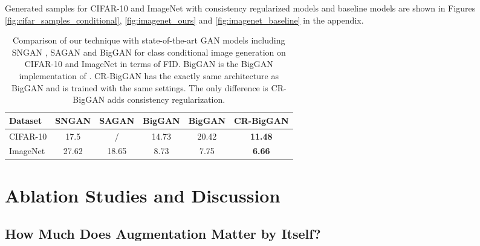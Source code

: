 \documentclass{article} \usepackage{iclr2020_conference,times}
\begin{document}
Generated samples for CIFAR-10 and ImageNet with consistency regularized models and baseline models are shown in Figures \ref{fig:cifar_samples_conditional}, \ref{fig:imagenet_ours} and \ref{fig:imagenet_baseline} in the appendix.

\begin{table*}[hbt]
\begin{center}
\begin{tabular}{l|ccccc}
\hline
Dataset  & SNGAN &SAGAN  & BigGAN  & BigGAN & CR-BigGAN \\
\hline
CIFAR-10 & 17.5  & /&  14.73  &20.42 & \textbf{11.48} \\
ImageNet & 27.62 & 18.65 &  8.73    & 7.75 & \textbf{6.66} \\ 

\hline
\hline
\end{tabular}
\end{center}
\vspace{-6pt}
    \caption{Comparison of our technique with state-of-the-art GAN models including SNGAN \citep{Miyato18b}, SAGAN \citep{SAGAN} and BigGAN \citep{BIGGAN} 
    for class conditional image generation on CIFAR-10 and ImageNet in terms of FID.
    BigGAN is the BigGAN implementation of \citet{compare_gan}.
    CR-BigGAN has the exactly same architecture as BigGAN and is trained with the same settings.
    The only difference is CR-BigGAN adds consistency regularization.}
\label{tab:compare_others} 
\end{table*}













\section{Ablation Studies and Discussion}

\subsection{How Much Does Augmentation Matter by Itself?}
\end{document}
